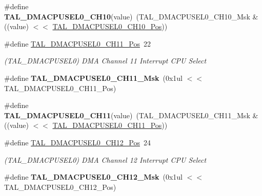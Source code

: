 \begin{DoxyCompactItemize}
\item 
\hypertarget{group___s_a_m_l21___t_a_l_gabcbc41c516da617be7861fda451323d8}{}\#define {\bfseries T\+A\+L\+\_\+\+D\+M\+A\+C\+P\+U\+S\+E\+L0\+\_\+\+C\+H10}(value)~(T\+A\+L\+\_\+\+D\+M\+A\+C\+P\+U\+S\+E\+L0\+\_\+\+C\+H10\+\_\+\+Msk \& ((value) $<$$<$ \hyperlink{group___s_a_m_l21___t_a_l_ga2cbca6bb6bad8ed95d6ebe9f4b2c4428}{T\+A\+L\+\_\+\+D\+M\+A\+C\+P\+U\+S\+E\+L0\+\_\+\+C\+H10\+\_\+\+Pos}))\label{group___s_a_m_l21___t_a_l_gabcbc41c516da617be7861fda451323d8}

\item 
\hypertarget{group___s_a_m_l21___t_a_l_gaff92f7168efdf05ed418fd8af704ecc0}{}\#define \hyperlink{group___s_a_m_l21___t_a_l_gaff92f7168efdf05ed418fd8af704ecc0}{T\+A\+L\+\_\+\+D\+M\+A\+C\+P\+U\+S\+E\+L0\+\_\+\+C\+H11\+\_\+\+Pos}~22\label{group___s_a_m_l21___t_a_l_gaff92f7168efdf05ed418fd8af704ecc0}

\begin{DoxyCompactList}\small\item\em (T\+A\+L\+\_\+\+D\+M\+A\+C\+P\+U\+S\+E\+L0) D\+M\+A Channel 11 Interrupt C\+P\+U Select \end{DoxyCompactList}\item 
\hypertarget{group___s_a_m_l21___t_a_l_ga42c654ec883611dfa0941744be7b35b5}{}\#define {\bfseries T\+A\+L\+\_\+\+D\+M\+A\+C\+P\+U\+S\+E\+L0\+\_\+\+C\+H11\+\_\+\+Msk}~(0x1ul $<$$<$ T\+A\+L\+\_\+\+D\+M\+A\+C\+P\+U\+S\+E\+L0\+\_\+\+C\+H11\+\_\+\+Pos)\label{group___s_a_m_l21___t_a_l_ga42c654ec883611dfa0941744be7b35b5}

\item 
\hypertarget{group___s_a_m_l21___t_a_l_ga90a2e4053b1aee688040f1516d444fd2}{}\#define {\bfseries T\+A\+L\+\_\+\+D\+M\+A\+C\+P\+U\+S\+E\+L0\+\_\+\+C\+H11}(value)~(T\+A\+L\+\_\+\+D\+M\+A\+C\+P\+U\+S\+E\+L0\+\_\+\+C\+H11\+\_\+\+Msk \& ((value) $<$$<$ \hyperlink{group___s_a_m_l21___t_a_l_gaff92f7168efdf05ed418fd8af704ecc0}{T\+A\+L\+\_\+\+D\+M\+A\+C\+P\+U\+S\+E\+L0\+\_\+\+C\+H11\+\_\+\+Pos}))\label{group___s_a_m_l21___t_a_l_ga90a2e4053b1aee688040f1516d444fd2}

\item 
\hypertarget{group___s_a_m_l21___t_a_l_ga0c4b3e0e6cbb842f4de5988d48d12c61}{}\#define \hyperlink{group___s_a_m_l21___t_a_l_ga0c4b3e0e6cbb842f4de5988d48d12c61}{T\+A\+L\+\_\+\+D\+M\+A\+C\+P\+U\+S\+E\+L0\+\_\+\+C\+H12\+\_\+\+Pos}~24\label{group___s_a_m_l21___t_a_l_ga0c4b3e0e6cbb842f4de5988d48d12c61}

\begin{DoxyCompactList}\small\item\em (T\+A\+L\+\_\+\+D\+M\+A\+C\+P\+U\+S\+E\+L0) D\+M\+A Channel 12 Interrupt C\+P\+U Select \end{DoxyCompactList}\item 
\hypertarget{group___s_a_m_l21___t_a_l_ga73e46cd93a6516f637d0227866e19ee4}{}\#define {\bfseries T\+A\+L\+\_\+\+D\+M\+A\+C\+P\+U\+S\+E\+L0\+\_\+\+C\+H12\+\_\+\+Msk}~(0x1ul $<$$<$ T\+A\+L\+\_\+\+D\+M\+A\+C\+P\+U\+S\+E\+L0\+\_\+\+C\+H12\+\_\+\+Pos)\label{group___s_a_m_l21___t_a_l_ga73e46cd93a6516f637d0227866e19ee4}


\end{DoxyCompactItemize}
